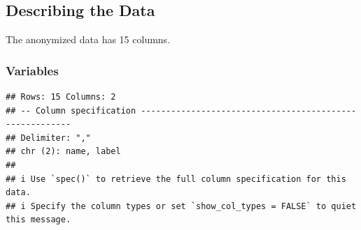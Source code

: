 \documentclass[
]{article}
\begin{document}
\hypertarget{describing-the-data}{%
\subsection{Describing the Data}\label{describing-the-data}}

The anonymized data has 15 columns.

\hypertarget{variables}{%
\subsubsection{Variables}\label{variables}}

\begin{verbatim}
## Rows: 15 Columns: 2
## -- Column specification --------------------------------------------------------
## Delimiter: ","
## chr (2): name, label
## 
## i Use `spec()` to retrieve the full column specification for this data.
## i Specify the column types or set `show_col_types = FALSE` to quiet this message.
\end{verbatim}
\end{document}
